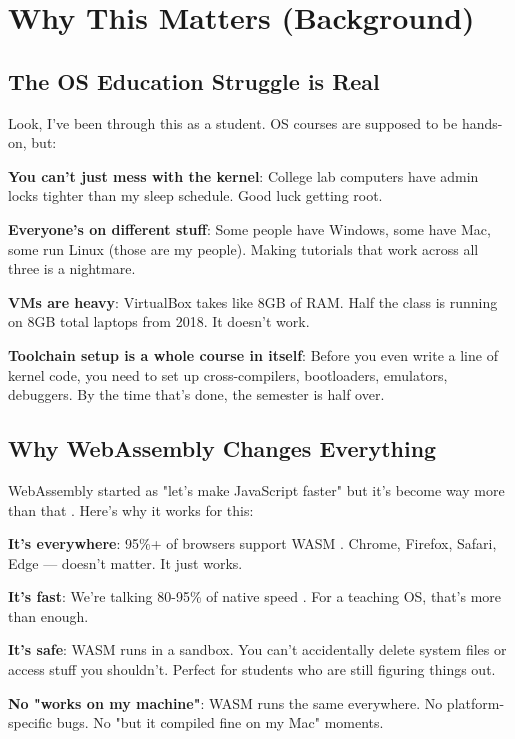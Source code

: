\documentclass[conference]{IEEEtran}
\begin{document}
\section{Why This Matters (Background)}

\subsection{The OS Education Struggle is Real}

Look, I've been through this as a student. OS courses are supposed to be hands-on, but:

\textbf{You can't just mess with the kernel}: College lab computers have admin locks tighter than my sleep schedule. Good luck getting root.

\textbf{Everyone's on different stuff}: Some people have Windows, some have Mac, some run Linux (those are my people). Making tutorials that work across all three is a nightmare.

\textbf{VMs are heavy}: VirtualBox takes like 8GB of RAM. Half the class is running on 8GB total laptops from 2018. It doesn't work.

\textbf{Toolchain setup is a whole course in itself}: Before you even write a line of kernel code, you need to set up cross-compilers, bootloaders, emulators, debuggers. By the time that's done, the semester is half over.

\subsection{Why WebAssembly Changes Everything}

WebAssembly started as "let's make JavaScript faster" but it's become way more than that \cite{haas2017bringing}. Here's why it works for this:

\textbf{It's everywhere}: 95\%+ of browsers support WASM \cite{caniuse2023}. Chrome, Firefox, Safari, Edge — doesn't matter. It just works.

\textbf{It's fast}: We're talking 80-95\% of native speed \cite{jangda2019not}. For a teaching OS, that's more than enough.

\textbf{It's safe}: WASM runs in a sandbox. You can't accidentally delete system files or access stuff you shouldn't. Perfect for students who are still figuring things out.

\textbf{No "works on my machine"}: WASM runs the same everywhere. No platform-specific bugs. No "but it compiled fine on my Mac" moments.
\end{document}
